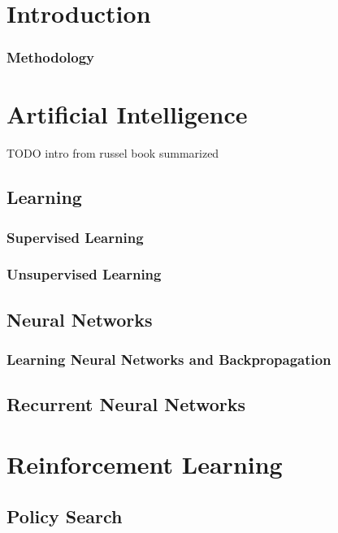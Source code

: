 \chapter{Introduction}

\subsection{Methodology}


\chapter{Artificial Intelligence}

 TODO intro from russel book summarized 
\section{Learning}

\subsection{Supervised Learning}

\subsection{Unsupervised Learning}

\section{Neural Networks}%
\label{sec:neural_networks}

\subsection{Learning Neural Networks and Backpropagation}
\label{sec:Backpropagation}


\section{Recurrent Neural Networks}%
\label{sec:recurrent_neural_networks}


\chapter{Reinforcement Learning}
\section{Policy Search}
